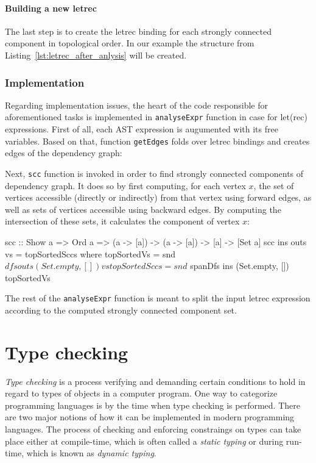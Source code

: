 \documentclass[12pt,a4paper]{report}
\begin{document}
\subsubsection{Building a new letrec}
The last step is to create the letrec binding for each strongly
connected component in topological order. In our example the structure from
Listing~\ref{lst:letrec_after_anlysis} will be created.


\subsection{Implementation}
Regarding implementation issues, the heart of the code responsible for
aforementioned tasks is implemented in \texttt{analyseExpr} function in case
for let(rec) expressions. First of all, each AST expression is
augumented with its free variables. Based on that, function \texttt{getEdges}
folds over letrec bindings and creates edges of the dependency graph:

\vspace*{0.2in}

Next, \texttt{scc} function is invoked in order to find strongly connected
components of dependency graph. It does so by first computing, for each vertex
$x$, the set of vertices accessible (directly or indirectly) from that vertex
using forward edges, as well as sets of vertices accessible using backward
edges. By computing the intersection of these sets, it calculates the component
of vertex $x$:

\vspace*{0.2in}
\begin{code}[style=haskell]
scc :: Show a => Ord a => (a -> [a]) -> (a -> [a]) -> [a] -> [Set a]
scc ins outs vs = topSortedSccs
    where
        topSortedVs = snd $ dfs outs (Set.empty, []) vs
        topSortedSccs = snd $ spanDfs ins (Set.empty, []) topSortedVs
\end{code}

The rest of the \texttt{analyseExpr} function is meant to split the input
letrec expression according to the computed strongly connected
component set.

\chapter{Type checking}
\textit{Type checking} is a process verifying and demanding certain conditions
to hold in regard to types of objects in a computer program. One way to
categorize programming languages is by the time when type checking is
performed. There are two major notions of how it can be implemented in modern
programming languages. The process of checking and enforcing constraings on
types can take place either at compile-time, which is often called a
\textit{static typing} or during run-time, which is known as \textit{dynamic
typing}.
\end{document}
